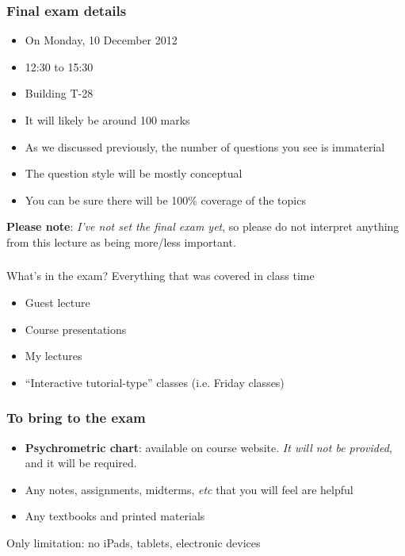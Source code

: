 
\begin{frame}\frametitle{Final exam details}
	\begin{itemize}
		\item	On Monday, 10 December 2012
		\item	12:30 to 15:30
		\item	Building T-28
		\item	It will likely be around 100 marks
		\item	As we discussed previously, the number of questions you see is immaterial
		\item	The question style will be mostly conceptual
		\item	You can be sure there will be 100\% coverage of the topics
	\end{itemize}
	\vspace{24pt}
	\textbf{Please note}: \emph{I've not set the final exam yet}, so please do not interpret anything from this lecture as being more/less important.
\end{frame}

\begin{frame}\frametitle{}
	\begin{exampleblock}{What's in the exam?}
		Everything that was covered in class time
	\end{exampleblock}
	\vspace{24pt}
	\begin{itemize}
		\item	Guest lecture
		\item	Course presentations
		\item	My lectures
		\item	``Interactive tutorial-type'' classes (i.e. Friday classes)
	\end{itemize}	
\end{frame}

\begin{frame}\frametitle{To bring to the exam}
	\begin{itemize}
		\item	\textbf{Psychrometric chart}: available on course website. \emph{It will not be provided}, and it will be required.
		\item	Any notes, assignments, midterms, \emph{etc} that you will feel are helpful
		\item	Any textbooks and printed materials
	\end{itemize}
	Only limitation: no iPads, tablets, electronic devices
\end{frame}

